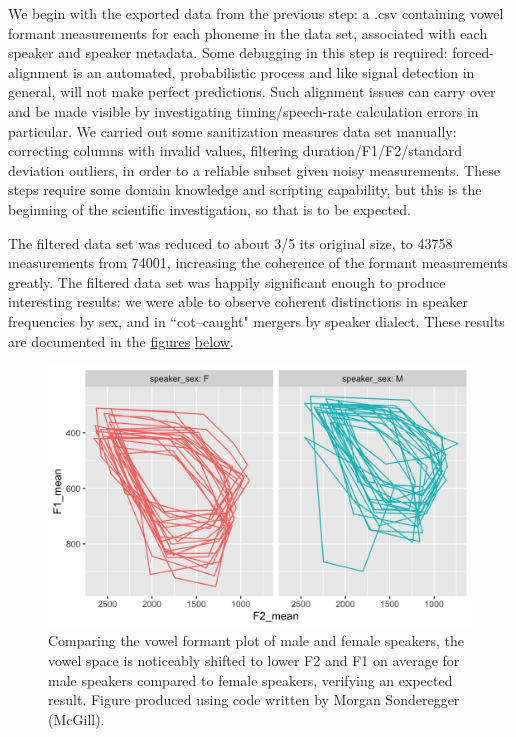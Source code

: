\documentclass[11pt]{article}
\begin{document}
We begin with the exported data from the previous step: a .csv containing vowel formant measurements for each phoneme in the data set, associated with each speaker and speaker metadata. Some debugging in this step is required: forced-alignment is an automated, probabilistic process and like signal detection in general, will not make perfect predictions. Such alignment issues can carry over and be made visible by investigating timing/speech-rate calculation errors in particular. We carried out some sanitization measures data set manually: correcting columns with invalid values, filtering duration/F1/F2/standard deviation outliers, in order to a reliable subset given noisy measurements. These steps require some domain knowledge and scripting capability, but this is the beginning of the scientific investigation, so that is to be expected.

The filtered data set was reduced to about 3/5 its original size, to 43758 measurements from 74001, increasing the coherence of the formant measurements greatly. The filtered data set was happily significant enough to produce interesting results: we were able to observe coherent distinctions in speaker frequencies by sex, and in ``cot--caught" mergers by speaker dialect. These results are documented in the \hyperlink{fig:sex_formant}{figures} \hyperlink{fig:dialect-analysis}{below}.

    \begin{figure}[h]
      \centering
      \includegraphics[scale=0.25]{sex_formant.png}
      \caption{Comparing the vowel formant plot of male and female speakers, the vowel space is noticeably shifted to lower F2 and F1 on average for male speakers compared to female speakers, verifying an expected result. Figure produced using code written by Morgan Sonderegger (McGill).}
      \label{fig:sex_formant}
    \end{figure}
\end{document}
